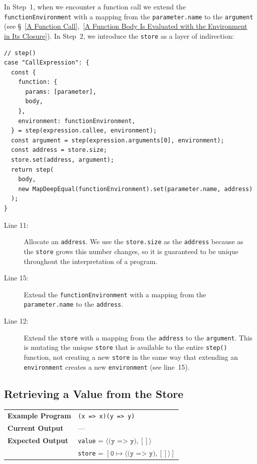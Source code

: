 \documentclass[12pt, oneside]{book}
\begin{document}
In Step~1, when we encounter a function call we extend the \texttt{functionEnvironment} with a mapping from the \texttt{parameter.name} to the \texttt{argument} (see §~\ref{A Function Call},~\ref{A Function Body Is Evaluated with the Environment in Its Closure}). In Step~2, we introduce the \texttt{store} as a layer of indirection:

\begin{verbatim}
// step()
case "CallExpression": {
  const {
    function: {
      params: [parameter],
      body,
    },
    environment: functionEnvironment,
  } = step(expression.callee, environment);
  const argument = step(expression.arguments[0], environment);
  const address = store.size;
  store.set(address, argument);
  return step(
    body,
    new MapDeepEqual(functionEnvironment).set(parameter.name, address)
  );
}
\end{verbatim}

\begin{description}
\item [Line 11:] Allocate an \texttt{address}. We use the \texttt{store.size} as the \texttt{address} because as the \texttt{store} grows this number changes, so it is guaranteed to be unique throughout the interpretation of a program.

\item [Line 15:] Extend the \texttt{functionEnvironment} with a mapping from the \texttt{parameter.name} to the \texttt{address}.

\item [Line 12:] Extend the \texttt{store} with a mapping from the \texttt{address} to the \texttt{argument}. This is mutating the unique \texttt{store} that is available to the entire \texttt{step()} function, not creating a new \texttt{store} in the same way that extending an \texttt{environment} creates a new \texttt{environment} (see line~15).
\end{description}

\subsection{Retrieving a Value from the Store}

\begin{center}
\begin{tabular}{ll}
\textbf{Example Program} & \texttt{(x => x)(y => y)} \\
\textbf{Current Output} & — \\
\textbf{Expected Output} & \texttt{value} = $\langle \texttt{(y => y)}, [] \rangle$ \\
& \texttt{store} = $[\texttt{0} \mapsto \langle \texttt{(y => y)}, [] \rangle]$ \\
\end{tabular}
\end{center}
\end{document}
